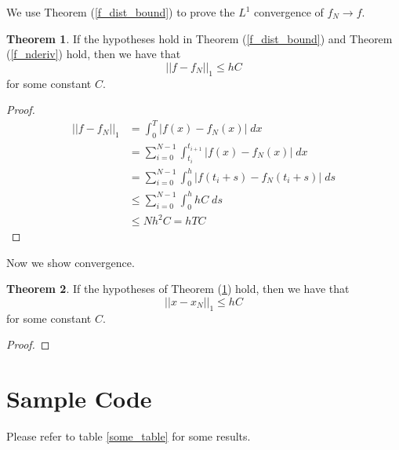 \documentclass[11pt]{article}
\numberwithin{equation}{section}
\theoremstyle{definition}
\newtheorem{theorem}{Theorem}[section]
\newcommand{\eq}[1]{\begin{align*}#1\end{align*}}
\newcommand{\thr}[1]{Theorem (\ref{#1})}
\begin{document}
We use \thr{f_dist_bound} to prove the $L^1$ convergence of $f_N \rightarrow f$.

\begin{theorem}
  \label{f_convergence}
  If the hypotheses hold in \thr{f_dist_bound} and \thr{f_nderiv} hold,
  then we have that
$$
  || f - f_N ||_1 \leq h C
$$
  for some constant $C$.
\end{theorem}
\begin{proof}
\eq{
  || f - f_N || _1
  &=
  \int_0^T |f(x) - f_N(x) |
  \; dx
  \\
%
%
  &= 
  \sum_{i=0}^{N-1} \int_{t_i}^{t_{i+1}}
  |f(x) - f_N(x)|
  \; dx
  \\
%
%
  &=
  \sum_{i=0}^{N-1}
  \int_0^h |f(t_i + s) - f_N(t_i + s)|
  \; ds
  \\
%
%
  &\leq
  \sum_{i=0}^{N-1}
  \int_0^h hC
  \; ds
  \\
%
%
  &\leq
  Nh^2 C
  =
  hTC
}
\end{proof}
Now we show convergence.
\begin{theorem}
  \label{convergence}
  If the hypotheses of \thr{f_convergence} hold,
  then we have that
$$
  ||x - x_N||_1
  \leq
  hC
$$
  for some constant $C$.
\end{theorem}
\begin{proof}
\end{proof}

\section{Sample Code}
\lstset{caption=Basic Scheme}

\lstset{caption=Lubich Scheme}

Please refer to table \ref{some_table} for some results.
\end{document}
